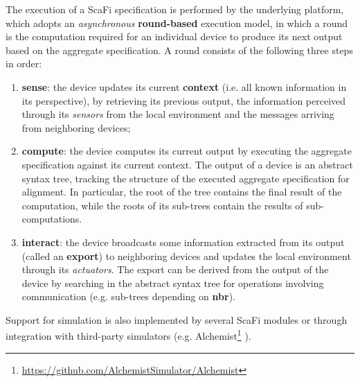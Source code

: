 The execution of a \ac{ScaFi} specification is performed by the underlying
platform, which adopts an \textit{asynchronous} \textbf{round-based} execution
model, in which a round is the computation required for an individual device to
produce its next output based on the aggregate specification. A round consists
of the following three steps in order:
\begin{enumerate}
  \item \textbf{sense}: the device updates its current \textbf{context} (i.e.
        all known information in its perspective), by retrieving its previous
        output, the information perceived through its \textit{sensors} from the
        local environment and the messages arriving from neighboring devices;
  \item \textbf{compute}: the device computes its current output by executing
        the aggregate specification against its current context. The output of
        a device is an abstract syntax tree, tracking the structure of the
        executed aggregate specification for alignment. In particular, the root
        of the tree contains the final result of the computation, while the
        roots of its sub-trees contain the results of sub-computations.
  \item \textbf{interact}: the device broadcasts some information extracted
        from its output (called an \textbf{export}) to neighboring devices and
        updates the local environment through its \textit{actuators}. The
        export can be derived from the output of the device by searching in the
        abstract syntax tree for operations involving communication (e.g.
        sub-trees depending on \textbf{nbr}).
\end{enumerate}

Support for simulation is also implemented by several \ac{ScaFi} modules or
through integration with third-party simulators (e.g.
Alchemist\footnote{\url{https://github.com/AlchemistSimulator/Alchemist}}
\cite{Alchemist}).
